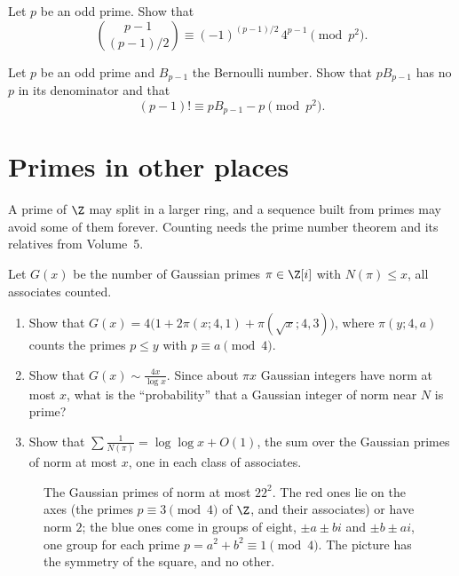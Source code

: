 \begin{exercise}[$\star\star$]\label{pb:morley}
Let $p$ be an odd prime. Show that
\[
\binom{p-1}{(p-1)/2}\equiv(-1)^{(p-1)/2}\,4^{p-1}\pmod{p^2}.
\]
\end{exercise}

\begin{exercise}[$\star\star\star$]\label{pb:glaisher}
Let $p$ be an odd prime and $B_{p-1}$ the Bernoulli number. Show that $pB_{p-1}$ has no $p$ in its denominator and that
\[
(p-1)!\equiv pB_{p-1}-p\pmod{p^2}.
\]
\end{exercise}

\section{Primes in other places}

A prime of $\Z$ may split in a larger ring, and a sequence built from primes may avoid some of them forever. Counting needs
the prime number theorem and its relatives from Volume~5.

\begin{exercise}[$\star\star$]\label{pb:gaussprimes}
Let $G(x)$ be the number of Gaussian primes $\pi\in\Z[i]$ with $N(\pi)\le x$, all associates counted.
\begin{enumerate}[label=(\alph*)]
\item Show that $G(x)=4\bigl(1+2\pi(x;4,1)+\pi(\sqrt x;4,3)\bigr)$, where $\pi(y;4,a)$ counts the primes $p\le y$ with
$p\equiv a\pmod4$.
\item Show that $G(x)\sim\frac{4x}{\log x}$. Since about $\pi x$ Gaussian integers have norm at most $x$, what is the
``probability'' that a Gaussian integer of norm near $N$ is prime?
\item Show that $\sum\frac1{N(\pi)}=\log\log x+O(1)$, the sum over the Gaussian primes of norm at most $x$, one in each
class of associates.
\end{enumerate}
\end{exercise}

\begin{figure}[ht]
\centering
{}
\caption{The Gaussian primes of norm at most $22^2$. The red ones lie on the axes (the primes $p\equiv3\pmod4$ of $\Z$, and
their associates) or have norm $2$; the blue ones come in groups of eight, $\pm a\pm bi$ and $\pm b\pm ai$, one group for each
prime $p=a^2+b^2\equiv1\pmod4$. The picture has the symmetry of the square, and no other.}
\label{fig:gaussprimes}
\end{figure}

